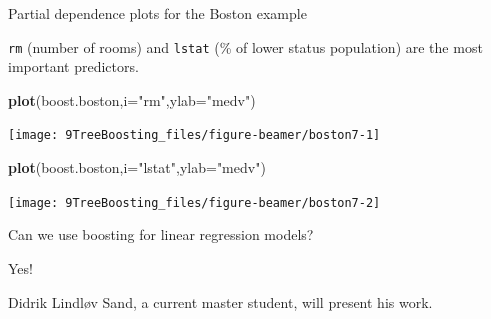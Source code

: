 \documentclass[
  10pt,
  ignorenonframetext,
]{beamer}
\newenvironment{Shaded}{\begin{snugshade}}{\end{snugshade}}
\newcommand{\AttributeTok}[1]{\textcolor[rgb]{0.13,0.29,0.53}{#1}}
\newcommand{\FunctionTok}[1]{\textcolor[rgb]{0.13,0.29,0.53}{\textbf{#1}}}
\newcommand{\NormalTok}[1]{#1}
\newcommand{\StringTok}[1]{\textcolor[rgb]{0.31,0.60,0.02}{#1}}
\begin{document}
\begin{frame}[fragile]
\begin{block}{Partial dependence plots for the Boston example}
\protect\hypertarget{partial-dependence-plots-for-the-boston-example}{}
\(~\)

\texttt{rm} (number of rooms) and \texttt{lstat} (\% of lower status
population) are the most important predictors.

\vspace{2mm}

\scriptsize

\begin{Shaded}
\begin{Highlighting}[]
\FunctionTok{plot}\NormalTok{(boost.boston,}\AttributeTok{i=}\StringTok{"rm"}\NormalTok{,}\AttributeTok{ylab=}\StringTok{"medv"}\NormalTok{)}
\end{Highlighting}
\end{Shaded}

\begin{center}\texttt{[image: 9TreeBoosting\_files/figure-beamer/boston7-1]} \end{center}

\begin{Shaded}
\begin{Highlighting}[]
\FunctionTok{plot}\NormalTok{(boost.boston,}\AttributeTok{i=}\StringTok{"lstat"}\NormalTok{,}\AttributeTok{ylab=}\StringTok{"medv"}\NormalTok{)}
\end{Highlighting}
\end{Shaded}

\begin{center}\texttt{[image: 9TreeBoosting\_files/figure-beamer/boston7-2]} \end{center}
\end{block}
\end{frame}

\begin{frame}{Can we use boosting for linear regression models?}
\protect\hypertarget{can-we-use-boosting-for-linear-regression-models}{}
\(~\)

Yes!

Didrik Lindløv Sand, a current master student, will present his work.
\end{frame}
\end{document}
